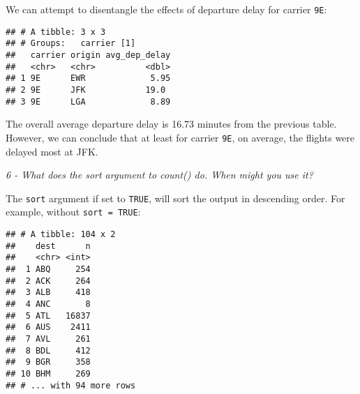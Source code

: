 \documentclass[]{article}
\newenvironment{Shaded}{\begin{snugshade}}{\end{snugshade}}
\newcommand{\KeywordTok}[1]{\textcolor[rgb]{0.13,0.29,0.53}{\textbf{#1}}}
\newcommand{\DataTypeTok}[1]{\textcolor[rgb]{0.13,0.29,0.53}{#1}}
\newcommand{\StringTok}[1]{\textcolor[rgb]{0.31,0.60,0.02}{#1}}
\newcommand{\OtherTok}[1]{\textcolor[rgb]{0.56,0.35,0.01}{#1}}
\newcommand{\OperatorTok}[1]{\textcolor[rgb]{0.81,0.36,0.00}{\textbf{#1}}}
\newcommand{\NormalTok}[1]{#1}
\theoremstyle{definition}
\theoremstyle{definition}
\theoremstyle{definition}
\theoremstyle{remark}
\begin{document}
We can attempt to disentangle the effects of departure delay for carrier
\texttt{9E}:

\begin{Shaded}
\end{Shaded}

\begin{verbatim}
## # A tibble: 3 x 3
## # Groups:   carrier [1]
##   carrier origin avg_dep_delay
##   <chr>   <chr>          <dbl>
## 1 9E      EWR             5.95
## 2 9E      JFK            19.0 
## 3 9E      LGA             8.89
\end{verbatim}

The overall average departure delay is 16.73 minutes from the previous
table. However, we can conclude that at least for carrier \texttt{9E},
on average, the flights were delayed most at JFK.

\emph{6 - What does the sort argument to count() do. When might you use
it?}

The \texttt{sort} argument if set to \texttt{TRUE}, will sort the output
in descending order. For example, without \texttt{sort\ =\ TRUE}:

\begin{Shaded}
\end{Shaded}

\begin{verbatim}
## # A tibble: 104 x 2
##    dest      n
##    <chr> <int>
##  1 ABQ     254
##  2 ACK     264
##  3 ALB     418
##  4 ANC       8
##  5 ATL   16837
##  6 AUS    2411
##  7 AVL     261
##  8 BDL     412
##  9 BGR     358
## 10 BHM     269
## # ... with 94 more rows
\end{verbatim}
\end{document}

